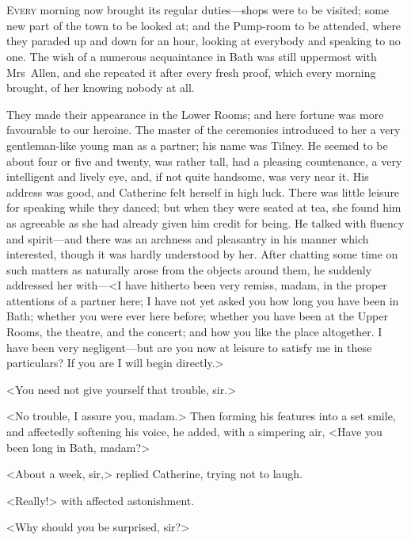 \chapter[Chapter \thechapter]{}

 \lettrine{E}{very} morning now brought its regular duties—shops were to be visited; some new part of the town to be looked at; and the Pump-room to be attended, where they paraded up and down for an hour, looking at everybody and speaking to no one. The wish of a numerous acquaintance in Bath was still uppermost with Mrs~Allen, and she repeated it after every fresh proof, which every morning brought, of her knowing nobody at all. 

 They made their appearance in the Lower Rooms; and here fortune was more favourable to our heroine. The master of the ceremonies introduced to her a very gentleman-like young man as a partner; his name was Tilney. He seemed to be about four or five and twenty, was rather tall, had a pleasing countenance, a very intelligent and lively eye, and, if not quite handsome, was very near it. His address was good, and Catherine felt herself in high luck. There was little leisure for speaking while they danced; but when they were seated at tea, she found him as agreeable as she had already given him credit for being. He talked with fluency and spirit—and there was an archness and pleasantry in his manner which interested, though it was hardly understood by her. After chatting some time on such matters as naturally arose from the objects around them, he suddenly addressed her with—<I have hitherto been very remiss, madam, in the proper attentions of a partner here; I have not yet asked you how long you have been in Bath; whether you were ever here before; whether you have been at the Upper Rooms, the theatre, and the concert; and how you like the place altogether. I have been very negligent—but are you now at leisure to satisfy me in these particulars? If you are I will begin directly.> 

 <You need not give yourself that trouble, sir.> 

 <No trouble, I assure you, madam.> Then forming his features into a set smile, and affectedly softening his voice, he added, with a simpering air, <Have you been long in Bath, madam?> 

 <About a week, sir,> replied Catherine, trying not to laugh. 

 <Really!> with affected astonishment. 

 <Why should you be surprised, sir?> 

